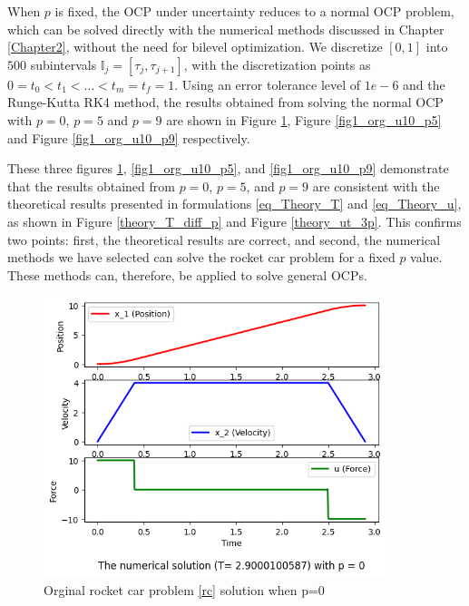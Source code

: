 \documentclass  [
  paper    = a4,
  BCOR     = 10mm,
  twoside,
  fontsize = 12pt,
  fleqn,
  toc      = bibnumbered,
  toc      = listofnumbered,
  numbers  = noendperiod,
  headings = normal,
  listof   = leveldown,
  version  = 3.03
]                                       {scrreprt}
\newcommand{\<}{\langle}
\renewcommand{\>}{\rangle}
\begin{document}
When $p$ is fixed, the OCP under uncertainty reduces to a normal OCP problem, which can be solved directly with the numerical methods discussed in Chapter \ref{Chapter2}, without the need for bilevel optimization. We discretize $[0,1]$ into $500$ subintervals $\mathbb{I}_j = [\tau_j, \tau_{j+1}]$, with the discretization points as $0 = t_0 < t_1 < \dots < t_m = t_f = 1$. Using an error tolerance level of $1e-6$ and the Runge-Kutta RK4 method, the results obtained from solving the normal OCP with $p=0$, $p=5$ and $p=9$ are shown in Figure \ref{fig1_org_u10_p0}, Figure \ref{fig1_org_u10_p5} and Figure \ref{fig1_org_u10_p9} respectively.

These three figures \ref{fig1_org_u10_p0}, \ref{fig1_org_u10_p5}, and \ref{fig1_org_u10_p9} demonstrate that the results obtained from $p=0$, $p=5$, and $p=9$ are consistent with the theoretical results presented in formulations \ref{eq_Theory_T} and \ref{eq_Theory_u}, as shown in Figure \ref{theory_T_diff_p} and Figure \ref{theory_ut_3p}. This confirms two points: first, the theoretical results are correct, and second, the numerical methods we have selected can solve the rocket car problem for a fixed $p$ value. These methods can, therefore, be applied to solve general OCPs.


\begin{figure}[H]
	\centerline{\includegraphics[width=10cm]{original_u10_p0.png}}
	\caption{Orginal rocket car problem \ref{rc} solution when p=0}
	\label{fig1_org_u10_p0}
\end{figure}
\end{document}
